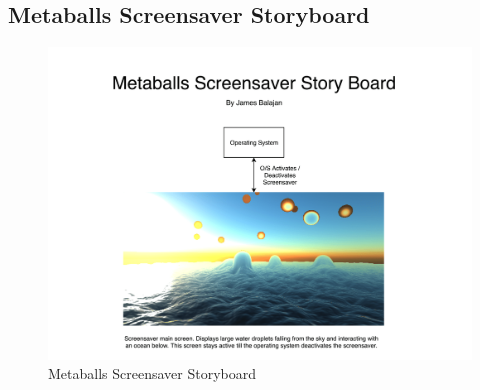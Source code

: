 \documentclass[10pt, openany]{book}
\begin{document}
\subsection{Metaballs Screensaver Storyboard}
\begin{figure}[H]
	\centering
	\includegraphics[width=1.0\linewidth]{Metaballs Screensaver Story Board}
	\caption{Metaballs Screensaver Storyboard}
	\label{app:metaballs-story}
\end{figure}
\newpage







\end{document}
